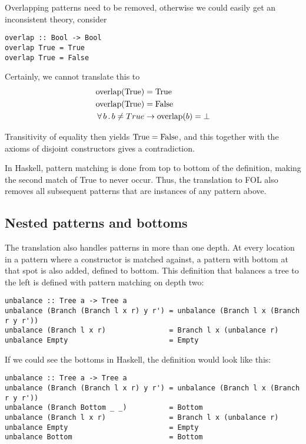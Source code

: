 Overlapping patterns need to be removed, otherwise we could easily get
an inconsistent theory, consider

\begin{verbatim}
overlap :: Bool -> Bool
overlap True = True
overlap True = False
\end{verbatim}

Certainly, we cannot translate this to
\begin{align*}
\mathrm{overlap}(\mathrm{True}) & = \mathrm{True} \\
\mathrm{overlap}(\mathrm{True}) & = \mathrm{False} \\
\forall \, b \, . \, b \neq True & \rightarrow \mathrm{overlap}(b) = \bot \\
\end{align*}

Transitivity of equality then yields $\mathrm{True} = \mathrm{False}$,
and this together with the axioms of disjoint constructors gives a
contradiction.

In Haskell, pattern matching is done from top to bottom of the
definition, making the second match of True to never occur. Thus, the
translation to FOL also removes all subsequent patterns that are
instances of any pattern above.

\subsection{Nested patterns and bottoms}

The translation also handles patterns in more than one depth. At every
location in a pattern where a constructor is matched against, a
pattern with bottom at that spot is also added, defined to
bottom. This definition that balances a tree to the left is defined
with pattern matching on depth two:

\begin{verbatim}
unbalance :: Tree a -> Tree a
unbalance (Branch (Branch l x r) y r') = unbalance (Branch l x (Branch r y r'))
unbalance (Branch l x r)               = Branch l x (unbalance r)
unbalance Empty                        = Empty
\end{verbatim}

If we could see the bottoms in Haskell, the definition would look like this:

\begin{verbatim}
unbalance :: Tree a -> Tree a
unbalance (Branch (Branch l x r) y r') = unbalance (Branch l x (Branch r y r'))
unbalance (Branch Bottom _ _)          = Bottom
unbalance (Branch l x r)               = Branch l x (unbalance r)
unbalance Empty                        = Empty
unbalance Bottom                       = Bottom
\end{verbatim}

